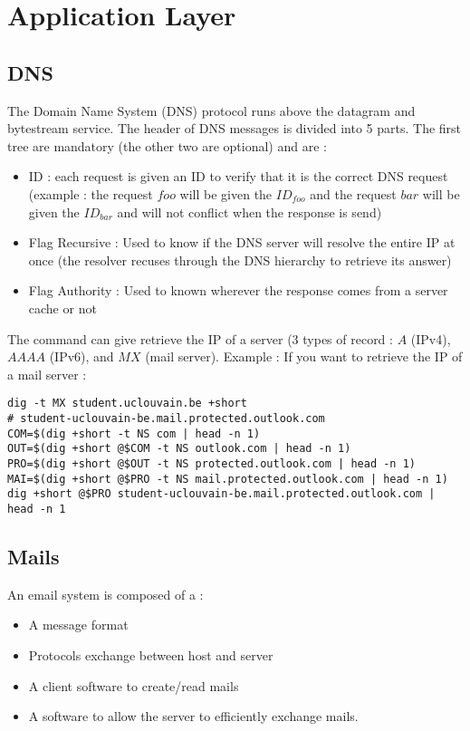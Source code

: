 \newpage
\section{Application Layer}

\subsection{DNS}

The Domain Name System (DNS) protocol runs above the datagram and bytestream service. The header of DNS messages is divided into 5 parts. The first tree are mandatory (the other two are optional) and are :
\begin{itemize}
\item ID : each request is given an ID to verify that it is the correct DNS request (example : the request $foo$ will be given the $ID_{foo}$ and the request $bar$ will be given the $ID_{bar}$ and will not conflict when the response is send)
\item Flag Recursive : Used to know if the DNS server will resolve the entire IP at once (the resolver recuses through the DNS hierarchy to retrieve its answer)
\item Flag Authority : Used to known wherever the response comes from a server cache or not
\end{itemize}

The command  can give retrieve the IP of a server (3 types of record : $A$ (IPv4), $AAAA$ (IPv6), and $MX$ (mail server). Example : If you want to retrieve the IP of a mail server :
\begin{verbatim}
dig -t MX student.uclouvain.be +short
# student-uclouvain-be.mail.protected.outlook.com
COM=$(dig +short -t NS com | head -n 1)
OUT=$(dig +short @$COM -t NS outlook.com | head -n 1)
PRO=$(dig +short @$OUT -t NS protected.outlook.com | head -n 1)
MAI=$(dig +short @$PRO -t NS mail.protected.outlook.com | head -n 1)
dig +short @$PRO student-uclouvain-be.mail.protected.outlook.com | head -n 1
\end{verbatim}

\subsection{Mails}

An email system is composed of a :
\begin{itemize}
\item A message format
\item Protocols exchange between host and server
\item A client software to create/read mails
\item A software to allow the server to efficiently exchange mails.
\end{itemize}

